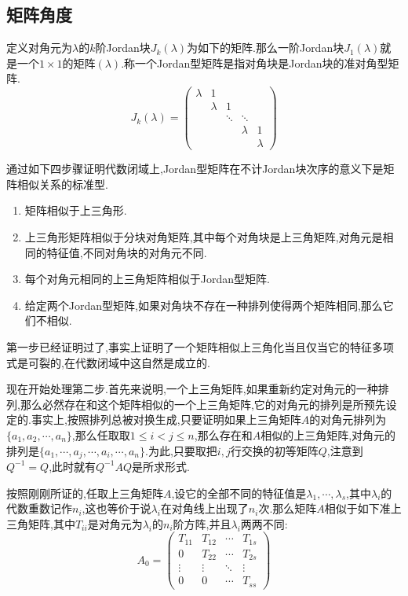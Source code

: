 \subsection{矩阵角度}

定义对角元为$\lambda$的$k$阶Jordan块$J_k(\lambda)$为如下的矩阵.那么一阶Jordan块$J_1(\lambda)$就是一个$1\times1$的矩阵$(\lambda)$.称一个Jordan型矩阵是指对角块是Jordan块的准对角型矩阵.
$$J_k(\lambda)=\left(\begin{array}{ccccc}
\lambda&1&&&\\
&\lambda&1&&\\
&&\ddots&\ddots&\\
&&&\lambda&1\\
&&&&\lambda\end{array}\right)$$

通过如下四步骤证明代数闭域上,Jordan型矩阵在不计Jordan块次序的意义下是矩阵相似关系的标准型.
\begin{enumerate}
	\item 矩阵相似于上三角形.
	\item 上三角形矩阵相似于分块对角矩阵,其中每个对角块是上三角矩阵,对角元是相同的特征值,不同对角块的对角元不同.
	\item 每个对角元相同的上三角矩阵相似于Jordan型矩阵.
	\item 给定两个Jordan型矩阵,如果对角块不存在一种排列使得两个矩阵相同,那么它们不相似.
\end{enumerate}

第一步已经证明过了,事实上证明了一个矩阵相似上三角化当且仅当它的特征多项式是可裂的,在代数闭域中这自然是成立的.

现在开始处理第二步.首先来说明,一个上三角矩阵,如果重新约定对角元的一种排列,那么必然存在和这个矩阵相似的一个上三角矩阵,它的对角元的排列是所预先设定的.事实上,按照排列总被对换生成,只要证明如果上三角矩阵$A$的对角元排列为$\{a_1,a_2,\cdots,a_n\}$,那么任取取$1\le i<j\le n$,那么存在和$A$相似的上三角矩阵,对角元的排列是$\{a_1,\cdots,a_j,\cdots,a_i,\cdots,a_n\}$.为此,只要取把$i,j$行交换的初等矩阵$Q$,注意到$Q^{-1}=Q$,此时就有$Q^{-1}AQ$是所求形式.

按照刚刚所证的,任取上三角矩阵$A$,设它的全部不同的特征值是$\lambda_1,\cdots,\lambda_s$,其中$\lambda_i$的代数重数记作$n_i$,这也等价于说$\lambda_i$在对角线上出现了$n_i$次.那么矩阵$A$相似于如下准上三角矩阵,其中$T_{ii}$是对角元为$\lambda_i$的$n_i$阶方阵,并且$\lambda_i$两两不同:
$$A_0=\left(\begin{array}{cccc}
T_{11}&T_{12}&\cdots&T_{1s}\\
0&T_{22}&\cdots&T_{2s}\\
\vdots&\vdots&\ddots&\vdots\\
0&0&\cdots&T_{ss}\end{array}\right)$$

